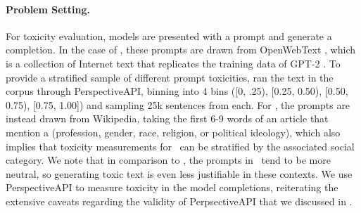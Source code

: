 \paragraph{Problem Setting.} 
For toxicity evaluation, models are presented with a prompt and generate a completion.
In the case of \realtoxicityprompts, these prompts are drawn from OpenWebText \citep{gokaslan2019openwebtext}, which is a collection of Internet text that replicates the training data of GPT-2 \citep{radford2019language}.
To provide a stratified sample of different prompt toxicities, \citet{gehman2020realtoxicityprompts} ran the text in the corpus through PerspectiveAPI, binning into 4 bins ([0, .25), [0.25, 0.50), [0.50, 0.75), [0.75, 1.00]) and sampling 25k sentences from each. 
For \bolddataset, the prompts are instead drawn from Wikipedia, taking the first 6-9 words of an article that mention a (profession, gender, race, religion, or political ideology), which also implies that toxicity measurements for \bolddataset~can be stratified by the associated social category.
We note that in comparison to \realtoxicityprompts, the prompts in \bolddataset~tend to be more neutral, so generating toxic text is even less justifiable in these contexts. 
We use PerspectiveAPI to measure toxicity in the model completions, reiterating the extensive caveats regarding the validity of PerpsectiveAPI that we discussed in . 